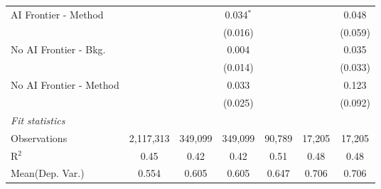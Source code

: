 \begin{tabular}{lcccccc}
   AI Frontier - Method    &               &               & 0.034$^{*}$   &              &              & 0.048\\   
                           &               &               & (0.016)       &              &              & (0.059)\\   
   No AI Frontier - Bkg.   &               &               & 0.004         &              &              & 0.035\\   
                           &               &               & (0.014)       &              &              & (0.033)\\   
   No AI Frontier - Method &               &               & 0.033         &              &              & 0.123\\   
                           &               &               & (0.025)       &              &              & (0.092)\\   
   \midrule
   \emph{Fit statistics}\\
   Observations            & 2,117,313     & 349,099       & 349,099       & 90,789       & 17,205       & 17,205\\  
   R$^2$                   & 0.45          & 0.42          & 0.42          & 0.51         & 0.48         & 0.48\\  
Mean(Dep. Var.) & 0.554 & 0.605 & 0.605 & 0.647 & 0.706 & 0.706 \\
   

\end{tabular}
